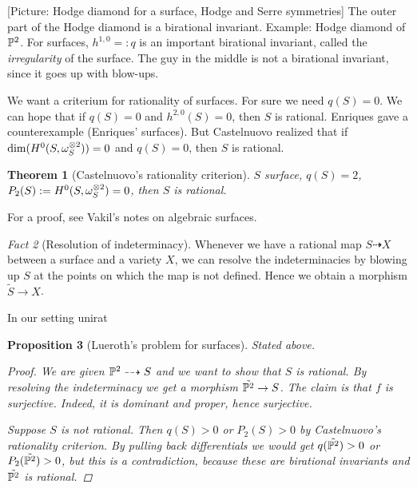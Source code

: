 \documentclass[A4paper, british]{amsart}
\theoremstyle{darkgreentheorem}
\newtheorem{thm}{Theorem}[section]
\newtheorem{prop}[thm]{Proposition}
\theoremstyle{darkbluedefinition}
\theoremstyle{darkredexample}
\theoremstyle{remark}
\newtheorem{fact}[thm]{Fact}
\newcommand{\1}{\mathbbm{1}}
\newcommand{\ot}{\otimes}
\begin{document}
[Picture: Hodge diamond for a surface, Hodge and Serre symmetries]
The outer part of the Hodge diamond is a birational invariant.
Example: Hodge diamond of $\P^{2}$.
For surfaces, $h^{1,0}=:q$ is an important birational invariant, called the \textit{irregularity} of the surface.
The guy in the middle is not a birational invariant, since it goes up with blow-ups.

We want a criterium for rationality of surfaces.
For sure we need $q(S)=0$.
We can hope that if $q(S)=0$ and $h^{2,0}(S)=0$, then $S$ is rational.
Enriques gave a counterexample (Enriques' surfaces).
But Castelnuovo realized that if $\dim(H^{0}(S,\w_{S}^{\ot 2}))=0$ and $q(S)=0$, then $S$ is rational.

\begin{thm}[Castelnuovo's rationality criterion]
    $S$ surface, $q(S)=2$, $P_{2}(S):=H^{0}(S,\w_{S}^{\ot 2})=0$, then $S$ is rational.
\end{thm}

For a proof, see Vakil's notes on algebraic surfaces.

\begin{fact}[Resolution of indeterminacy]
    Whenever we have a rational map $S\dashrightarrow X$ between a surface and a variety $X$, we can resolve the indeterminacies by blowing up $S$ at the points on which the map is not defined.
    Hence we obtain a morphism $\tilde{S}\to X$.
\end{fact}

In our setting unirat
\begin{center}
\end{center}

\begin{prop}[Lueroth's problem for surfaces]
    Stated above.
    \begin{proof}
	We are given $\P^{2}\dashrightarrow S$ and we want to show that $S$ is rational.
	By resolving the indeterminacy we get a morphism $\tilde{\P^{2}}\to S$.
	The claim is that $f$ is surjective.
	Indeed, it is dominant and proper, hence surjective.

	Suppose $S$ is not rational.
	Then $q(S)>0$ or $P_{2}(S)>0$ by Castelnuovo's rationality criterion.
	By pulling back differentials we would get $q(\tilde{\P^{2}})>0$ or $P_{2}(\tilde{\P^{2}})>0$, but this is a contradiction, because these are birational invariants and $\tilde{\P^{2}}$ is rational.
    \end{proof}
\end{prop}
\end{document}
